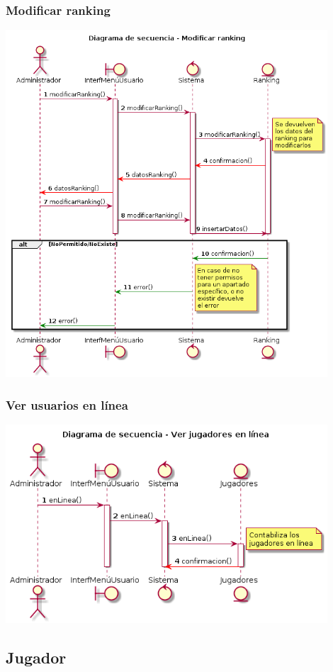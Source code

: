 \subsubsection{Modificar ranking}
  \includegraphics[width=0.9\textwidth]{./imatges/administrador/Modificar_ranking.png}
\subsubsection{Ver usuarios en línea}
  \includegraphics[width=0.9\textwidth]{./imatges/administrador/Ver_usuarios_en_linea.png}



\subsection{Jugador}\label{sec:uc0}
